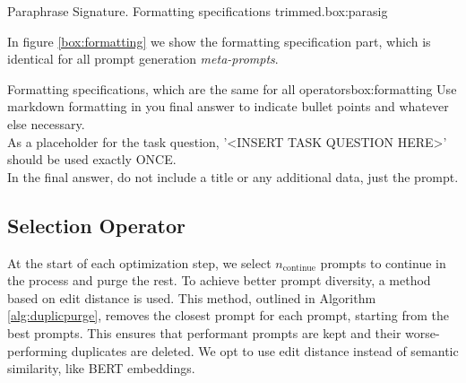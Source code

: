 \begin{figurebox}{Paraphrase Signature. Formatting specifications trimmed.}{box:parasig}
\end{figurebox}
In figure \ref{box:formatting} we show the formatting specification part, which is identical for all prompt generation \textit{meta-prompts}.

\begin{figurebox}{Formatting specifications, which are the same for all operators}{box:formatting}
    Use markdown formatting in you final answer to indicate bullet points and whatever else necessary.\\
    As a placeholder for the task question, '<INSERT TASK QUESTION HERE>' should be used exactly ONCE.\\
    In the final answer, do not include a title or any additional data, just the prompt.
\end{figurebox}

\subsection{Selection Operator}
At the start of each optimization step, we select $n_{\text{continue}}$ prompts to continue in the process and purge the rest. 
To achieve better prompt diversity, a method based on edit distance is used. This method, outlined in Algorithm \ref{alg:duplicpurge},
removes the closest prompt for each prompt, starting from the best prompts. This ensures that performant prompts are kept and their worse-performing duplicates are deleted.
We opt to use edit distance instead of semantic similarity, like BERT embeddings.

